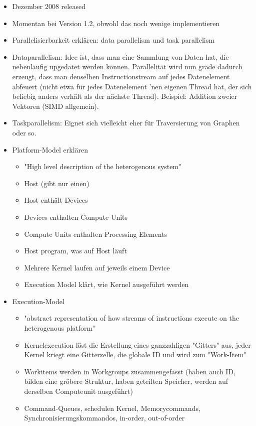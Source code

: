 \begin{itemize}
\item Dezember 2008 released
\item Momentan bei Version 1.2, obwohl das noch wenige implementieren
\item Parallelisierbarkeit erklären: data parallelism und task parallelism
\item Dataparallelism: Idee ist, dass man eine Sammlung von Daten hat, die
nebenläufig upgedatet werden können. Parallelität wird nun grade dadurch
erzeugt, dass man denselben Instructionstream auf jedes Datenelement abfeuert
(nicht etwa für jedes Datenelement 'nen eigenen Thread hat, der sich beliebig
 anders verhält als der nächste Thread). Beispiel: Addition zweier Vektoren
(SIMD allgemein).
\item Taskparallelism: Eignet sich vielleicht eher für Traversierung von Graphen
oder so.
\item Platform-Model erklären
	\begin{itemize}
		\item "High level description of the heterogenous system"
		\item Host (gibt nur einen)
		\item Host enthält Devices
		\item Devices enthalten Compute Units
		\item Compute Units enthalten Processing Elements
		\item Host program, was auf Host läuft
		\item Mehrere Kernel laufen auf jeweils einem Device
		\item Execution Model klärt, wie Kernel ausgeführt werden
	\end{itemize}
\item Execution-Model
	\begin{itemize}
		\item "abstract representation of how streams of instructions execute on the heterogenous platform"
		\item Kernelexecution löst die Erstellung eines ganzzahligen "Gitters" aus, jeder Kernel kriegt eine Gitterzelle, die globale ID und wird zum "Work-Item"
		\item Workitems werden in Workgroups zusammengefasst (haben auch ID, bilden eine gröbere Struktur, haben geteilten Speicher, werden auf derselben Computeunit ausgeführt)
		\item Command-Queues, schedulen Kernel, Memorycommands, Synchronisierungskommandos, in-order, out-of-order

\end{itemize}
\end{itemize}
